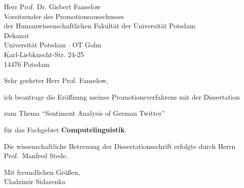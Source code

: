 \documentclass[12pt]{dinbrief}
\newcommand{\sgdh}{Sehr geehrter Herr Prof. Fanselow}
\newcommand{\wowa}{Uladzimir Sidarenka}
\begin{document}
\begin{letter}
  {
    Herr Prof. Dr. Gisbert Fanselow\\
    Vorsitzender des Promotionsausschusses\\
    der Humanwissenschaftlichen Fakult\"at der Universit\"at Potsdam\\
    Dekanat\\
    Universit\"at Potsdam $\cdot$ OT Golm\\
    Karl-Liebknecht-Str. 24-25\\
    14476 Potsdam
  }

    \addresshigh
    \nowindowrules %
    \nobackaddressrule %

    \date{\today}
    \subject{\textbf{Antrag auf Er\"offnung meines Promotionsverfahrens}}
    \opening{\sgdh,}

    ich beantrage die Er\"offnung meines Promotionsverfahrens mit der
    Dissertation

    zum Thema ``Sentiment Analysis of German Twitter''

    f\"ur das Fachgebiet \textbf{Computelinguistik}.

    Die wissenschaftliche Betreuung der Dissertationsschrift erfolgte
    durch Herrn Prof.~Manfred Stede.

    \bigskip
    \closing{Mit freundlichen Gr\"u\ss{}en,\\ \wowa}
\end{letter}
\end{document}
